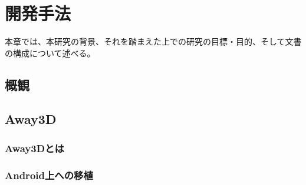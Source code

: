 \chapter{開発手法}
\label{chap:coding}

本章では、本研究の背景、それを踏まえた上での研究の目標・目的、そして文書の構成について述べる。

\section{概観}


\section{Away3D}

\subsection{Away3Dとは}

\subsection{Android上への移植}


